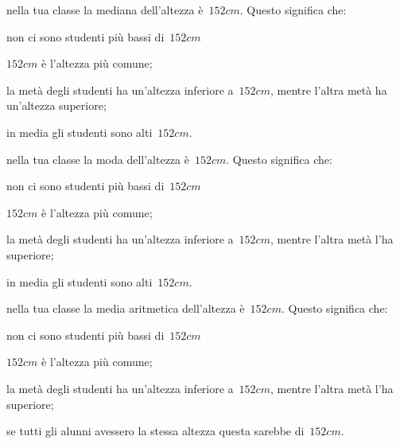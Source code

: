 \begin{esercizio}
\begin{enumerate*}
\begin{enumeratea}
 \end{enumeratea}
\item nella tua classe la mediana dell'altezza è~$152\unit{cm}$. Questo significa che:
 \begin{enumeratea}
\item non ci sono studenti più bassi di~$152\unit{cm}$
\item $152\unit{cm}$ è l'altezza più comune;
\item la metà degli studenti ha un'altezza inferiore a~$152\unit{cm}$, mentre l'altra metà ha un'altezza superiore;
\item in media gli studenti sono alti~$152\unit{cm}$.
 \end{enumeratea}
\item nella tua classe la moda dell'altezza è~$152\unit{cm}$. Questo significa che:
 \begin{enumeratea}
\item non ci sono studenti più bassi di~$152\unit{cm}$
\item $152\unit{cm}$ è l'altezza più comune;
\item la metà degli studenti ha un'altezza inferiore a~$152\unit{cm}$, mentre l'altra metà l'ha superiore;
\item in media gli studenti sono alti~$152\unit{cm}$.
 \end{enumeratea}
\item nella tua classe la media aritmetica dell'altezza è~$152\unit{cm}$. Questo significa che:
 \begin{enumeratea}
\item non ci sono studenti più bassi di~$152\unit{cm}$
\item $152\unit{cm}$ è l'altezza più comune;
\item la metà degli studenti ha un'altezza inferiore a~$152\unit{cm}$, mentre l'altra metà l'ha superiore;
\item se tutti gli alunni avessero la stessa altezza questa sarebbe di~$152\unit{cm}$.
 \end{enumeratea}

\end{enumerate*}
\end{esercizio}

